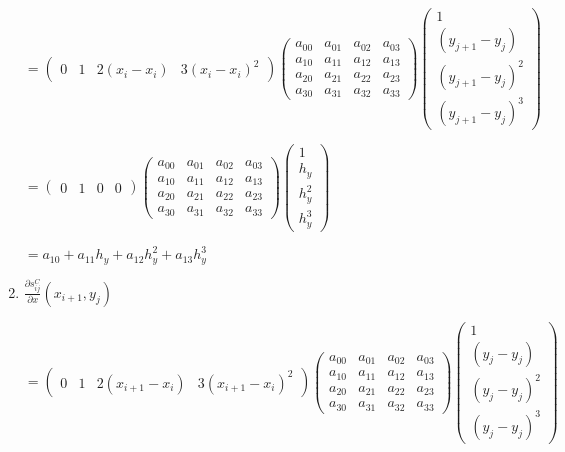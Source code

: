 \documentclass[11pt]{article}
\begin{document}
\begin{enumerate}[label=\textbf{\arabic*)}]
    \begin{flushleft}
    $= \begin{pmatrix}
      0 & 1 & 2(x_i - x_i) & 3(x_i - x_i)^2
    \end{pmatrix}
    \begin{pmatrix}
      a_{00}  & a_{01} & a_{02} & a_{03} \\
      a_{10}  & a_{11} & a_{12} & a_{13} \\
      a_{20}  & a_{21} & a_{22} & a_{23} \\
      a_{30}  & a_{31} & a_{32} & a_{33}
    \end{pmatrix}
    \begin{pmatrix}
      1  \\
      (y_{j + 1} - y_j) \\
      (y_{j + 1} - y_j)^2  \\
      (y_{j + 1} - y_j)^3
    \end{pmatrix}$


    $= \begin{pmatrix}
      0 & 1 & 0 & 0
    \end{pmatrix}
    \begin{pmatrix}
      a_{00}  & a_{01} & a_{02} & a_{03} \\
      a_{10}  & a_{11} & a_{12} & a_{13} \\
      a_{20}  & a_{21} & a_{22} & a_{23} \\
      a_{30}  & a_{31} & a_{32} & a_{33}
    \end{pmatrix}
    \begin{pmatrix}
      1  \\
      h_y  \\
      h_y^2  \\
      h_y^3
    \end{pmatrix}$

    $= a_{10} + a_{11}h_y + a_{12}h_y^2 + a_{13}h_y^3$
    \end{flushleft}

    \item $\frac{\partial s_{ij}^C}{\partial x}(x_{i + 1}, y_j)$

    \begin{flushleft}
    $= \begin{pmatrix}
      0 & 1 & 2(x_{i + 1} - x_i) & 3(x_{i + 1} - x_i)^2
    \end{pmatrix}
    \begin{pmatrix}
      a_{00}  & a_{01} & a_{02} & a_{03} \\
      a_{10}  & a_{11} & a_{12} & a_{13} \\
      a_{20}  & a_{21} & a_{22} & a_{23} \\
      a_{30}  & a_{31} & a_{32} & a_{33}
    \end{pmatrix}
    \begin{pmatrix}
      1  \\
      (y_j - y_j) \\
      (y_j - y_j)^2  \\
      (y_j - y_j)^3
    \end{pmatrix}$



\end{flushleft}
\end{enumerate}
\end{document}
